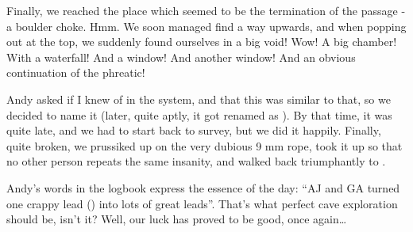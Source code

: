 Finally, we reached the place which seemed to be the termination of the
passage - a boulder choke. Hmm. We soon managed find a way upwards, and
when popping out at the top, we suddenly found ourselves in a big void!
Wow! A big chamber! With a waterfall! And a window! And another window!
And an obvious continuation of the phreatic!





Andy asked if I knew of  in the system, and that
this was similar to that, so we decided to name it  (later, quite aptly, it got renamed as ). By
that time, it was quite late, and we had to start back to survey, but we
did it happily. Finally, quite broken, we prussiked up on the very
dubious 9 mm rope, took it up so that no other person repeats the same
insanity, and walked back triumphantly to .

Andy's words in the logbook express the essence of the day: ``AJ and GA
turned one crappy lead () into lots of great leads''.
That's what perfect cave exploration should be, isn't it? Well, our luck
has proved to be good, once again\ldots{}



